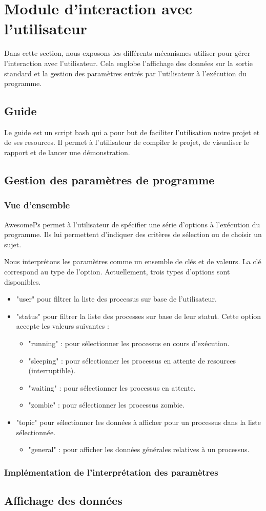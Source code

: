 \section{Module d'interaction avec l’utilisateur}
Dans cette section, nous exposons les différents mécanismes utiliser pour gérer l’interaction avec l’utilisateur. Cela englobe l’affichage des données sur la sortie standard et la gestion des paramètres entrés par l’utilisateur à l’exécution du programme.

\subsection{Guide}
Le guide est un script bash qui a pour but de faciliter l'utilisation notre projet et de ses resources. Il permet à l'utilisateur de compiler le projet, de visualiser le rapport et de lancer une démonstration.

\subsection{Gestion des paramètres de programme}
\subsubsection{Vue d'ensemble}
AwesomePs permet à l'utilisateur de spécifier une série d'options à l'exécution du programme. Ils lui permettent d'indiquer des critères de sélection ou de choisir un sujet.

Nous interprétons les paramètres comme un ensemble de clés et de valeurs. La clé correspond au type de l'option. Actuellement, trois types d'options sont disponibles.

\begin{itemize}
\item "user" pour filtrer la liste des processus sur base de l'utilisateur.
\item "status" pour filtrer la liste des processes sur base de leur statut. Cette option accepte les valeurs suivantes :
    \begin{itemize}
        \item "running" : pour sélectionner les processus en cours d'exécution.
        \item "sleeping" : pour sélectionner les processus en attente de resources (interruptible).
        \item "waiting" : pour sélectionner les processus en attente.
        \item "zombie" : pour sélectionner les processus zombie.
    \end{itemize}
\item "topic" pour sélectionner les données à afficher pour un processus dans la liste sélectionnée.
    \begin{itemize}
        \item "general" : pour afficher les données générales relatives à un processus.
    \end{itemize}
\end{itemize}

\subsubsection{Implémentation de l'interprétation des paramètres}

\subsection{Affichage des données}